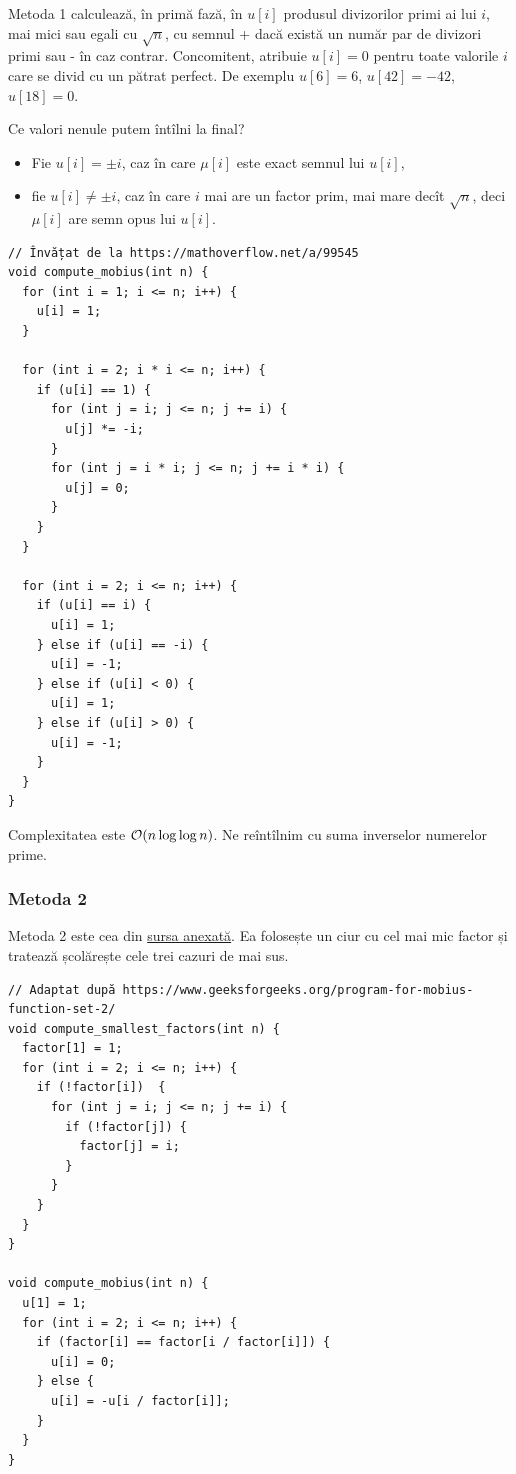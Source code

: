 \documentclass[../main.tex]{subfiles}
\begin{document}
Metoda 1 calculează, în primă fază, în $u[i]$ produsul divizorilor primi ai lui $i$, mai mici sau egali cu $\sqrt{n}$, cu semnul + dacă există un număr par de divizori primi sau - în caz contrar. Concomitent, atribuie $u[i] = 0$ pentru toate valorile $i$ care se divid cu un pătrat perfect. De exemplu $u[6] = 6$, $u[42] = -42$, $u[18] = 0$.

Ce valori nenule putem întîlni la final?

\begin{itemize}
  \item Fie $u[i] = \pm i$, caz în care $\mu[i]$ este exact semnul lui $u[i]$,

  \item fie $u[i] \neq \pm i$, caz în care $i$ mai are un factor prim, mai mare decît $\sqrt{n}$, deci $\mu[i]$ are semn opus lui $u[i]$.
\end{itemize}

\begin{verbatim}
// Învățat de la https://mathoverflow.net/a/99545
void compute_mobius(int n) {
  for (int i = 1; i <= n; i++) {
    u[i] = 1;
  }

  for (int i = 2; i * i <= n; i++) {
    if (u[i] == 1) {
      for (int j = i; j <= n; j += i) {
        u[j] *= -i;
      }
      for (int j = i * i; j <= n; j += i * i) {
        u[j] = 0;
      }
    }
  }

  for (int i = 2; i <= n; i++) {
    if (u[i] == i) {
      u[i] = 1;
    } else if (u[i] == -i) {
      u[i] = -1;
    } else if (u[i] < 0) {
      u[i] = 1;
    } else if (u[i] > 0) {
      u[i] = -1;
    }
  }
}
\end{verbatim}

Complexitatea este $\mathcal{O}(n \log \log n)$. Ne reîntîlnim cu suma inverselor numerelor prime.

\subsubsection*{Metoda 2}

Metoda 2 este cea din \hyperref[code:counting-coprime-pairs]{sursa anexată}. Ea folosește un ciur cu cel mai mic factor și tratează școlărește cele trei cazuri de mai sus.

\begin{verbatim}
// Adaptat după https://www.geeksforgeeks.org/program-for-mobius-function-set-2/
void compute_smallest_factors(int n) {
  factor[1] = 1;
  for (int i = 2; i <= n; i++) {
    if (!factor[i])  {
      for (int j = i; j <= n; j += i) {
        if (!factor[j]) {
          factor[j] = i;
        }
      }
    }
  }
}

void compute_mobius(int n) {
  u[1] = 1;
  for (int i = 2; i <= n; i++) {
    if (factor[i] == factor[i / factor[i]]) {
      u[i] = 0;
    } else {
      u[i] = -u[i / factor[i]];
    }
  }
}
\end{verbatim}
\end{document}
